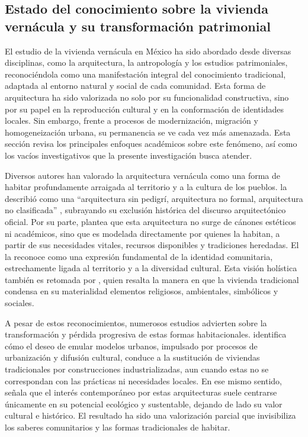 \subsection{Estado del conocimiento sobre la vivienda vernácula y su transformación patrimonial}

El estudio de la vivienda vernácula en México ha sido abordado desde diversas disciplinas, como la arquitectura, la antropología y los estudios patrimoniales, reconociéndola como una manifestación integral del conocimiento tradicional, adaptada al entorno natural y social de cada comunidad. Esta forma de arquitectura ha sido valorizada no solo por su funcionalidad constructiva, sino por su papel en la reproducción cultural y en la conformación de identidades locales. Sin embargo, frente a procesos de modernización, migración y homogeneización urbana, su permanencia se ve cada vez más amenazada. Esta sección revisa los principales enfoques académicos sobre este fenómeno, así como los vacíos investigativos que la presente investigación busca atender.

Diversos autores han valorado la arquitectura vernácula como una forma de habitar profundamente arraigada al territorio y a la cultura de los pueblos. \citeauthor{rudofsky1976arquitectura} la describió como una “arquitectura sin pedigrí, arquitectura no formal, arquitectura no clasificada” \citep[p. 9]{rudofsky1976arquitectura}, subrayando su exclusión histórica del discurso arquitectónico oficial. Por su parte, \citeauthor{gonzalez2017arquitectura} plantea que esta arquitectura no surge de cánones estéticos ni académicos, sino que es modelada directamente por quienes la habitan, a partir de sus necesidades vitales, recursos disponibles y tradiciones heredadas. El \cite{icomos1999carta} la reconoce como una expresión fundamental de la identidad comunitaria, estrechamente ligada al territorio y a la diversidad cultural. Esta visión holística también es retomada por \citeauthor{zarate2009arquitectura}, quien resalta la manera en que la vivienda tradicional condensa en su materialidad elementos religiosos, ambientales, simbólicos y sociales.

A pesar de estos reconocimientos, numerosos estudios advierten sobre la transformación y pérdida progresiva de estas formas habitacionales. \citeauthor{alvarez2003maguey} identifica cómo el deseo de emular modelos urbanos, impulsado por procesos de urbanización y difusión cultural, conduce a la sustitución de viviendas tradicionales por construcciones industrializadas, aun cuando estas no se correspondan con las prácticas ni necesidades locales. En ese mismo sentido, \cite{gandara2000} señala que el interés contemporáneo por estas arquitecturas suele centrarse únicamente en su potencial ecológico y sustentable, dejando de lado su valor cultural e histórico. El resultado ha sido una valorización parcial que invisibiliza los saberes comunitarios y las formas tradicionales de habitar.

